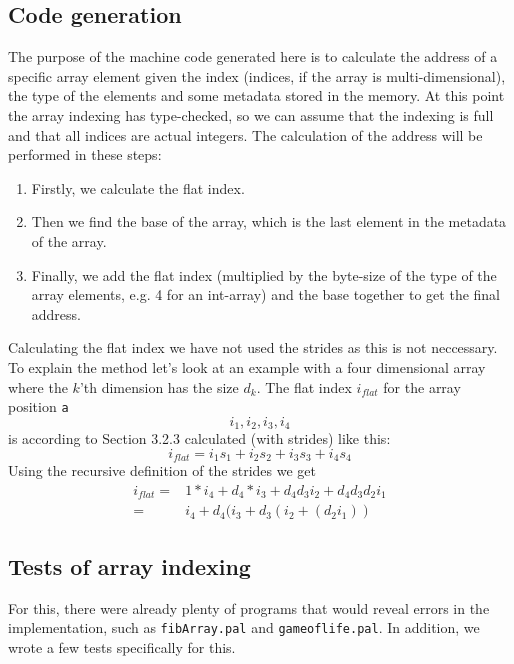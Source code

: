 \documentclass{article}
\begin{document}
\subsection{Code generation}
The purpose of the machine code generated here is to calculate the address of a specific array element given the index (indices, if the array is multi-dimensional), the type of the elements and some metadata stored in the memory. At this point the array indexing has type-checked, so we can assume that the indexing is full and that all indices are actual integers. The calculation of the address will be performed in these steps:
\begin{enumerate}
  \item Firstly, we calculate the flat index.
  \item Then we find the base of the array, which is the last element in the metadata of the array.
  \item Finally, we add the flat index (multiplied by the byte-size of the type of the array elements, e.g. 4 for an int-array) and the base together to get the final address.
\end{enumerate}
Calculating the flat index we have not used the strides as this is not neccessary. To explain the method let's look at an example with a four dimensional array where the $k$'th dimension has the size $d_k$. The flat index $i_{flat}$ for the array position \texttt{a\[i_1,i_2,i_3,i_4\]} is
according to Section 3.2.3 calculated (with strides) like this:
\begin{equation*}
i_{flat} = i_1 s_1 + i_2 s_2 + i_3 s_3 + i_4 s_4
\end{equation*}
Using the recursive definition of the strides we get
\begin{align*}
i_{flat} = & 1*i_4 + d_4*i_3 + d_4 d_3 i_2 + d_4 d_3 d_2 i_1 \\
       =  & i_4 + d_4 (i_3 + d_3 (i_2 + (d_2 i_1))
\end{align*}

\subsection{Tests of array indexing}

For this, there were already plenty of programs that would reveal errors in the implementation, such as \texttt{fibArray.pal} and \texttt{gameoflife.pal}. In addition, we wrote a few tests specifically for this. %
\end{document}
